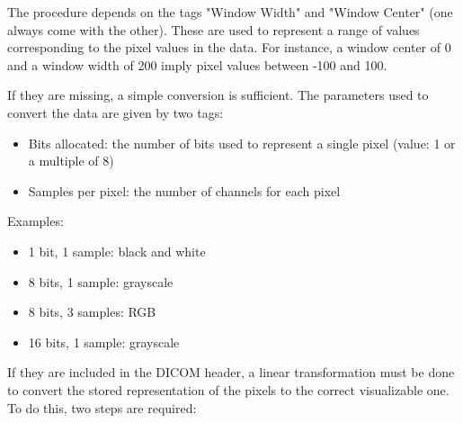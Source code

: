 The procedure depends on the tags "Window Width" and "Window Center" (one always come with the other). These are used to represent a range of values corresponding to the pixel values in the data. For instance, a window center of 0 and a window width of 200 imply pixel values between -100 and 100. 

If they are missing, a simple conversion is sufficient. The parameters used to convert the data are given by two tags: 
\begin{itemize}
	\item Bits allocated: the number of bits used to represent a single pixel (value: 1 or a multiple of 8)
	\item Samples per pixel: the number of channels for each pixel

\end{itemize}

\noindent Examples: 
\begin{itemize}
\item 1 bit, 1 sample: black and white
\item 8 bits, 1 sample: grayscale
\item 8 bits, 3 samples: RGB
\item 16 bits, 1 sample: grayscale

\end{itemize} 

\noindent If they are included in the DICOM header, a linear transformation must be done to convert the stored representation of the pixels to the correct visualizable one. To do this, two steps are required: 

